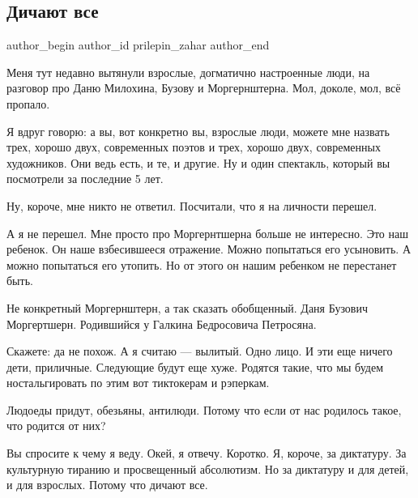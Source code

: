  
 
 
 
 
 
\subsection{Дичают все}
\label{sec:23_01_2022.tg.prilepin_zahar.1.chitajut_vse}
 
\ifcmt
 author_begin
   author_id prilepin_zahar
 author_end
\fi

Меня тут недавно вытянули взрослые, догматично настроенные люди, на разговор
про Даню Милохина, Бузову и Моргернштерна. Мол, доколе, мол, всё пропало.

Я вдруг говорю: а вы, вот конкретно вы, взрослые люди, можете мне назвать трех,
хорошо двух, современных поэтов и трех, хорошо двух, современных художников.
Они ведь есть, и те, и другие. Ну и один спектакль, который вы посмотрели за
последние 5 лет.

Ну, короче, мне никто не ответил. Посчитали, что я на личности перешел.

А я не перешел. Мне просто про Моргернтшерна больше не интересно. Это наш
ребенок. Он наше взбесившееся отражение. Можно попытаться его усыновить. А
можно попытаться его утопить. Но от этого он нашим ребенком не перестанет быть.

Не конкретный Моргернштерн, а так сказать обобщенный. Даня Бузович Моргертшерн.
Родившийся у Галкина Бедросовича Петросяна.

Скажете: да не похож. А я считаю — вылитый. Одно лицо. И эти еще ничего дети,
приличные. Следующие будут еще хуже. Родятся такие, что мы будем
ностальгировать по этим вот тиктокерам и рэперкам.

Людоеды придут, обезьяны, антилюди. Потому что если от нас родилось такое, что
родится от них?

Вы спросите к чему я веду. Окей, я отвечу. Коротко. Я, короче, за диктатуру. За
культурную тиранию и просвещенный абсолютизм. Но за диктатуру и для детей, и
для взрослых. Потому что дичают все.
